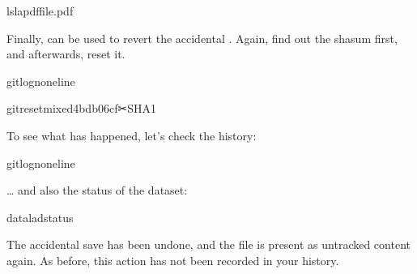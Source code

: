 \begin{sphinxVerbatim}[commandchars=\\\{\}]
ls\PYGZhy{}lapdffile.pdf
\end{sphinxVerbatim}

\sphinxAtStartPar
Finally,  can be used to revert the
accidental . Again, find out the shasum first, and
afterwards, reset it.

\begin{sphinxVerbatim}[commandchars=\\\{\}]
gitlog\PYGZhy{}n\PYGZhy{}\PYGZhy{}oneline
\end{sphinxVerbatim}

\begin{sphinxVerbatim}[commandchars=\\\{\}]
gitreset\PYGZhy{}\PYGZhy{}mixed4bdb06cf✂SHA1
\end{sphinxVerbatim}

\sphinxAtStartPar
To see what has happened, let’s check the history:

\begin{sphinxVerbatim}[commandchars=\\\{\}]
gitlog\PYGZhy{}n\PYGZhy{}\PYGZhy{}oneline
\end{sphinxVerbatim}

\sphinxAtStartPar
… and also the status of the dataset:

\begin{sphinxVerbatim}[commandchars=\\\{\}]
dataladstatus
\end{sphinxVerbatim}

\sphinxAtStartPar
The accidental save has been undone, and the file is present
as untracked content again.
As before, this action has not been recorded in your history.


